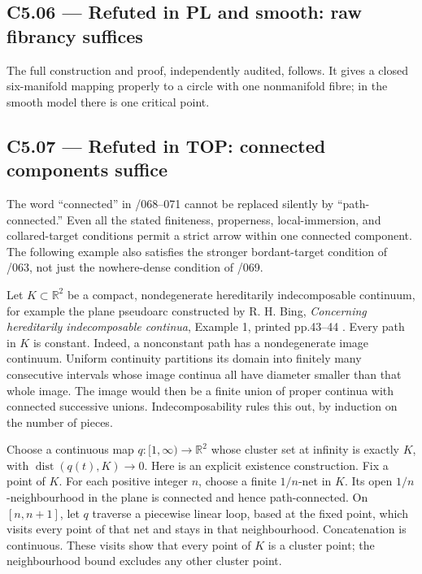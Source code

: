 \subsection{C5.06 --- Refuted in PL and smooth: raw fibrancy suffices}\label{c5.06-refuted-in-pl-and-smooth-raw-fibrancy-suffices}

The full construction and proof, independently audited, follows. It gives a closed six-manifold mapping properly to a circle with one nonmanifold fibre; in the smooth model there is one critical point.



\subsection{C5.07 --- Refuted in TOP: connected components suffice}\label{c5.07-refuted-in-top-connected-components-suffice}

The word ``connected'' in /068--071 cannot be replaced silently by ``path-connected.'' Even all the stated finiteness, properness, local-immersion, and collared-target conditions permit a strict arrow within one connected component. The following example also satisfies the stronger bordant-target condition of /063, not just the nowhere-dense condition of /069.

Let \(K\subset\mathbb R^2\) be a compact, nondegenerate hereditarily indecomposable continuum, for example the plane pseudoarc constructed by R. H. Bing, \emph{Concerning hereditarily indecomposable continua}, Example 1, printed pp.43--44 \cite{C_Bing1951}. Every path in \(K\) is constant. Indeed, a nonconstant path has a nondegenerate image continuum. Uniform continuity partitions its domain into finitely many consecutive intervals whose image continua all have diameter smaller than that whole image. The image would then be a finite union of proper continua with connected successive unions. Indecomposability rules this out, by induction on the number of pieces.

Choose a continuous map \(q:[1,\infty)\to\mathbb R^2\) whose cluster set at infinity is exactly \(K\), with \(\operatorname{dist}(q(t),K)\to0\). Here is an explicit existence construction. Fix a point of \(K\). For each positive integer \(n\), choose a finite \(1/n\)-net in \(K\). Its open \(1/n\)-neighbourhood in the plane is connected and hence path-connected. On \([n,n+1]\), let \(q\) traverse a piecewise linear loop, based at the fixed point, which visits every point of that net and stays in that neighbourhood. Concatenation is continuous. These visits show that every point of \(K\) is a cluster point; the neighbourhood bound excludes any other cluster point.


